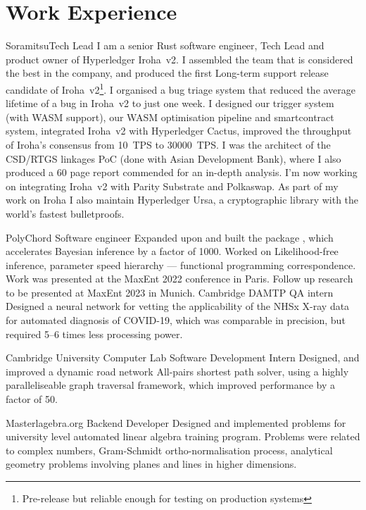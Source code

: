 \documentclass{CurriculumVitae}[10pt, condensed]
\begin{document}
\section*{Work Experience} {%
  \setlength{\parindent}{0in}%

   {Soramitsu}{Tech Lead} {I am a senior Rust
    software engineer, Tech Lead and product owner of Hyperledger
    Iroha~v2.  I assembled the team that is considered the best in the
    company, and produced the first Long-term support release
    candidate of Iroha~v2\footnote{Pre-release but reliable enough for
      testing on production systems}. I organised a bug triage system
    that reduced the average lifetime of a bug in Iroha~v2 to just one
    week. I designed our trigger system (with WASM support), our WASM
    optimisation pipeline and smartcontract system, integrated
    Iroha~v2 with Hyperledger Cactus, improved the throughput of
    Iroha's consensus from 10~TPS to 30000~TPS. I was the architect of
    the CSD/RTGS linkages PoC (done with Asian Development Bank),
    where I also produced a 60 page report commended for an in-depth
    analysis. I'm now working on integrating Iroha~v2 with Parity
    Substrate and Polkaswap. As part of my work on Iroha I also
    maintain Hyperledger Ursa, a cryptographic library with the
    world's fastest bulletproofs. }


  {PolyChord} {Software engineer} { Expanded upon and built the
    package , which accelerates Bayesian inference by
    a factor of 1000. Worked on Likelihood-free inference, parameter
    speed hierarchy --- functional programming correspondence. Work
    was presented at the MaxEnt 2022 conference in Paris. Follow up
    research to be presented at MaxEnt 2023 in Munich. }
   {Cambridge DAMTP} {QA intern} {Designed a
    neural network for vetting the applicability of the NHSx X-ray
    data for automated diagnosis of COVID-19, which was comparable in
    precision, but required 5--6 times less processing power.  }
  
   {Cambridge University Computer Lab}
  {Software Development Intern} {Designed, and improved a dynamic road
    network All-pairs shortest path solver, using a highly
    paralleliseable graph traversal framework, which improved
    performance by a factor of 50.  }
  
    {Masterlagebra.org} {Backend Developer}
  {Designed and implemented problems for university level automated
    linear algebra training program. Problems were related to complex
    numbers, Gram-Schmidt ortho-normalisation process, analytical geometry
    problems involving planes and lines in higher dimensions.
  }
}
\end{document}
